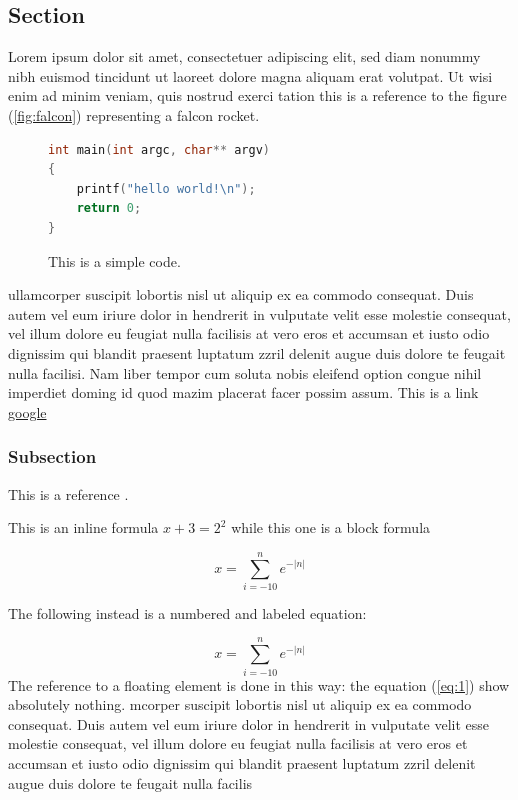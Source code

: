 \documentclass[a4paper,10pt]{article}
\begin{document}
\subsection{Section}

Lorem ipsum
dolor sit amet, consectetuer adipiscing elit, sed diam nonummy nibh euismod tincidunt ut
laoreet dolore magna aliquam erat volutpat. Ut wisi enim ad minim veniam, quis nostrud exerci tation this is a reference to the figure (\ref{fig:falcon}) representing a falcon rocket.

\begin{figure}

\begin{lstlisting}[language=c]
int main(int argc, char** argv)
{
    printf("hello world!\n");
    return 0;
}
\end{lstlisting}

\caption{This is a simple code.}
\end{figure}

ullamcorper suscipit lobortis nisl ut aliquip ex ea commodo consequat. Duis autem vel eum iriure dolor in hendrerit in
vulputate velit esse molestie consequat, vel illum dolore eu feugiat nulla facilisis at vero eros et
accumsan et iusto odio dignissim qui blandit praesent luptatum zzril delenit augue duis dolore te feugait nulla facilisi.
Nam liber tempor cum soluta nobis eleifend option congue nihil imperdiet doming id quod mazim placerat facer possim assum.
This is a link \href{www.google.com"}{google}


\subsubsection{Subsection}

This is a reference \cite{fnref:1}.


This is an inline formula \(x+3 = 2^2\) while this one is a block formula


\[
x = \sum_{i=-10}^n e^{-|n|}
\]


The following instead is a numbered and labeled equation:

\begin{equation}
\label{eq:1}
x = \sum_{i=-10}^n e^{-|n|}
\end{equation}
The reference to a floating element is done in this way: the equation (\ref{eq:1}) show absolutely nothing.
mcorper suscipit lobortis nisl ut aliquip ex ea commodo consequat. Duis autem vel eum iriure dolor in hendrerit in
vulputate velit esse molestie consequat, vel illum dolore eu feugiat nulla facilisis at vero eros et
accumsan et iusto odio dignissim qui blandit praesent luptatum zzril delenit augue duis dolore te feugait nulla facilis
\end{document}
